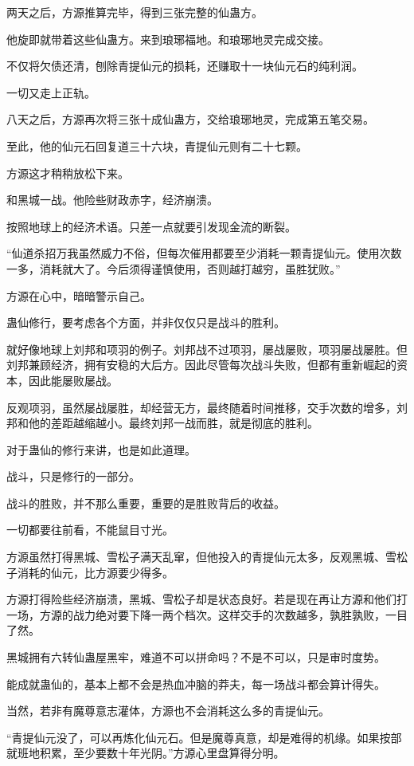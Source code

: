 \begin{this_body}
两天之后，方源推算完毕，得到三张完整的仙蛊方。

他旋即就带着这些仙蛊方。来到琅琊福地。和琅琊地灵完成交接。

不仅将欠债还清，刨除青提仙元的损耗，还赚取十一块仙元石的纯利润。

一切又走上正轨。

八天之后，方源再次将三张十成仙蛊方，交给琅琊地灵，完成第五笔交易。

至此，他的仙元石回复道三十六块，青提仙元则有二十七颗。

方源这才稍稍放松下来。

和黑城一战。他险些财政赤字，经济崩溃。

按照地球上的经济术语。只差一点就要引发现金流的断裂。

“仙道杀招万我虽然威力不俗，但每次催用都要至少消耗一颗青提仙元。使用次数一多，消耗就大了。今后须得谨慎使用，否则越打越穷，虽胜犹败。”

方源在心中，暗暗警示自己。

蛊仙修行，要考虑各个方面，并非仅仅只是战斗的胜利。

就好像地球上刘邦和项羽的例子。刘邦战不过项羽，屡战屡败，项羽屡战屡胜。但刘邦兼顾经济，拥有安稳的大后方。因此尽管每次战斗失败，但都有重新崛起的资本，因此能屡败屡战。

反观项羽，虽然屡战屡胜，却经营无方，最终随着时间推移，交手次数的增多，刘邦和他的差距越缩越小。最终刘邦一战而胜，就是彻底的胜利。

对于蛊仙的修行来讲，也是如此道理。

战斗，只是修行的一部分。

战斗的胜败，并不那么重要，重要的是胜败背后的收益。

一切都要往前看，不能鼠目寸光。

方源虽然打得黑城、雪松子满天乱窜，但他投入的青提仙元太多，反观黑城、雪松子消耗的仙元，比方源要少得多。

方源打得险些经济崩溃，黑城、雪松子却是状态良好。若是现在再让方源和他们打一场，方源的战力绝对要下降一两个档次。这样交手的次数越多，孰胜孰败，一目了然。

黑城拥有六转仙蛊屋黑牢，难道不可以拼命吗？不是不可以，只是审时度势。

能成就蛊仙的，基本上都不会是热血冲脑的莽夫，每一场战斗都会算计得失。

当然，若非有魔尊意志灌体，方源也不会消耗这么多的青提仙元。

“青提仙元没了，可以再炼化仙元石。但是魔尊真意，却是难得的机缘。如果按部就班地积累，至少要数十年光阴。”方源心里盘算得分明。


\end{this_body}
